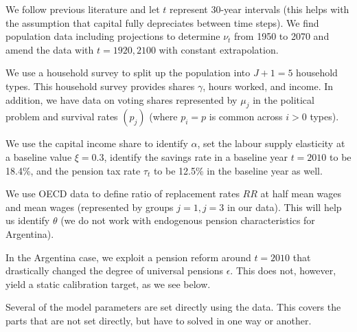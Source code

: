 \documentclass[a4paper]{article}
\begin{document}
We follow previous literature and let $t$ represent 30-year intervals (this helps with the assumption that capital fully depreciates between time steps). We find population data including projections to determine $\nu_t$ from 1950 to 2070 and amend the data with $t = 1920, 2100$  with constant extrapolation.

We use a household survey to split up the population into $J+1 = 5$ household types. This household survey provides shares $\gamma$, hours worked, and income. In addition, we have data on voting shares represented by $\mu_j$ in the political problem and survival rates $(p_j)$ (where $p_i = p$ is common across $i>0$ types). 

We use the capital income share to identify $\alpha$, set the labour supply elasticity at a baseline value $\xi = 0.3$, identify the savings rate in a baseline year $t=2010$ to be 18.4\%, and the pension tax rate $\tau_t$ to be 12.5\% in the baseline year as well. 

We use OECD data to define ratio of replacement rates $RR$ at half mean wages and mean wages (represented by groups $j=1, j=3$ in our data). This will help us identify $\theta$ (we do not work with endogenous pension characteristics for Argentina). 

In the Argentina case, we exploit a pension reform around $t=2010$ that drastically changed the degree of universal pensions $\epsilon$. This does not, however, yield a static calibration target, as we see below.


Several of the model parameters are set directly using the data. This covers the parts that are not set directly, but have to solved in one way or another.
\end{document}
